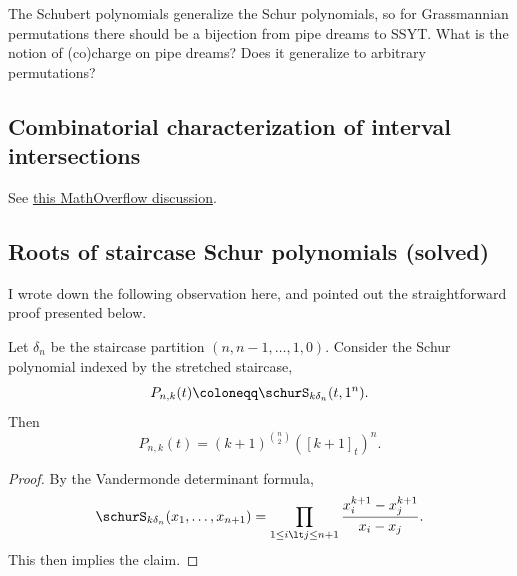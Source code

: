 The Schubert polynomials generalize the Schur polynomials,
so for Grassmannian permutations there should be a bijection
from pipe dreams to SSYT.
What is the notion of (co)charge on pipe dreams?
Does it generalize to arbitrary permutations?



\subsection[intersections]{Combinatorial characterization of interval intersections}

See
\href{https://mathoverflow.net/questions/251560/combinatorial-characterization-of-intersecting-intervals-in-the-plane}{this
MathOverflow discussion}.


\subsection[staircaseSchurRoots]{Roots of staircase Schur polynomials (solved)}

I wrote down the following observation here,
and  pointed out the straightforward proof presented below.
\begin{proposition}
Let $\delta_n$ be the staircase partition $(n,n-1,\dotsc,1,0)$.
Consider the Schur polynomial indexed by the stretched staircase,
\[
P_{n,k}(t) \coloneqq \schurS_{k \delta_n}(t,1^{n}).
\]
Then
\[
P_{n,k}(t) = (k+1)^{\binom{n}{2}} ([k+1]_t)^{n}.
\]
\end{proposition}
\begin{proof}
By the Vandermonde determinant formula,
\[
\schurS_{k \delta_n}(x_1,\dotsc,x_{n+1}) = \prod_{1 \leq i \lt j \leq n+1}
\frac{x_i^{k+1}-x_j^{k+1}}{x_i-x_j}.
\]
This then implies the claim.
\end{proof}
